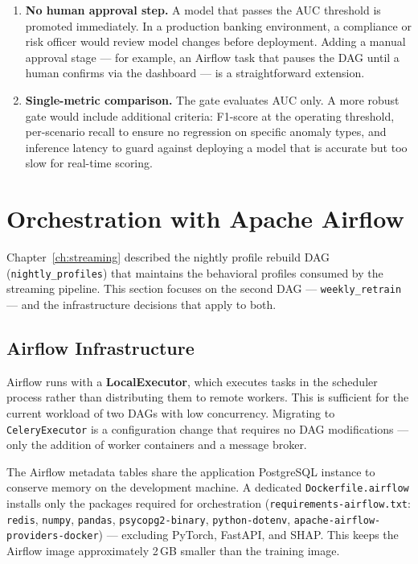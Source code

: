 \begin{enumerate}
    \item \textbf{No human approval step.} A model that passes the AUC
          threshold is promoted immediately. In a production banking
          environment, a compliance or risk officer would review model
          changes before deployment. Adding a manual approval stage ---
          for example, an Airflow task that pauses the DAG until a human
          confirms via the dashboard --- is a straightforward extension.
    \item \textbf{Single-metric comparison.} The gate evaluates AUC only.
          A more robust gate would include additional criteria: F1-score
          at the operating threshold, per-scenario recall to ensure no
          regression on specific anomaly types, and inference latency to
          guard against deploying a model that is accurate but too slow
          for real-time scoring.
\end{enumerate}


\section{Orchestration with Apache Airflow}
\label{sec:airflow}

Chapter~\ref{ch:streaming} described the nightly profile rebuild DAG
(\texttt{nightly\_profiles}) that maintains the behavioral profiles consumed
by the streaming pipeline. This section focuses on the second DAG ---
\texttt{weekly\_retrain} --- and the infrastructure decisions that apply to
both.

\subsection{Airflow Infrastructure}

Airflow runs with a \textbf{LocalExecutor}, which executes tasks in the
scheduler process rather than distributing them to remote workers. This is
sufficient for the current workload of two DAGs with low concurrency.
Migrating to \texttt{CeleryExecutor} is a configuration change that
requires no DAG modifications --- only the addition of worker containers
and a message broker.

The Airflow metadata tables share the application PostgreSQL instance to
conserve memory on the development machine. A dedicated
\texttt{Dockerfile.airflow} installs only the packages required for
orchestration (\texttt{requirements-airflow.txt}: \texttt{redis},
\texttt{numpy}, \texttt{pandas}, \texttt{psycopg2-binary},
\texttt{python-dotenv}, \texttt{apache-airflow-providers-docker}) ---
excluding PyTorch, FastAPI, and SHAP. This keeps the Airflow image
approximately 2\,GB smaller than the training image.

